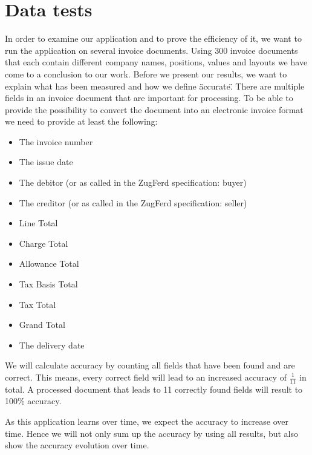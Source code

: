 %
% 
\chapter{Data tests}
\label{cha6}

In order to examine our application and to prove the efficiency of it, we want to run the application on several invoice documents. Using 300 invoice documents that each contain different company names, positions, values and layouts we have come to a conclusion to our work.
Before we present our results, we want to explain what has been measured and how we define \"accurate\".
There are multiple fields in an invoice document that are important for processing. To be able to provide the possibility to convert the document into an electronic invoice format we need to provide at least the following:
\begin{itemize}
\itemsep -1em 
	\item The invoice number
	\item The issue date
	\item The debitor (or as called in the ZugFerd specification: buyer)
	\item The creditor (or as called in the ZugFerd specification: seller)
	\item Line Total
	\item Charge Total
	\item Allowance Total
	\item Tax Basis Total
	\item Tax Total
	\item Grand Total
	\item The delivery date
\end{itemize}

We will calculate accuracy by counting all fields that have been found and are correct. This means, every correct field will lead to an increased accuracy of $\frac{1}{11}$ in total. A processed document that leads to 11 correctly found fields will result to 100\% accuracy. 

As this application learns over time, we expect the accuracy to increase over time. Hence we will not only sum up the accuracy by using all results, but also show the accuracy evolution over time.

